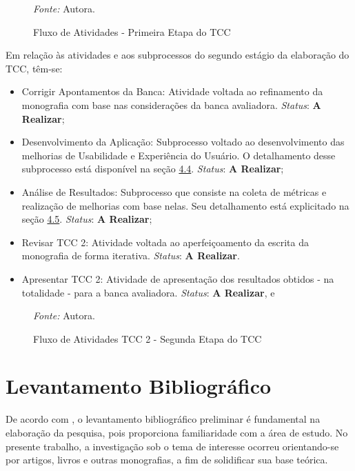 \pagebreak

\begin{figure}[h!]
	\centering
	\caption{Fluxo de Atividades - Primeira Etapa do TCC}
	\begin{tablenotes}[flushleft]
		\centering
		\item \textit{Fonte:} Autora.
	  \end{tablenotes}
	\label{fig04}
\end{figure}
Em relação às atividades e aos subprocessos do segundo estágio da elaboração do TCC, têm-se:

\begin{itemize}
	\item Corrigir Apontamentos da Banca: Atividade voltada ao refinamento da monografia com base nas considerações da banca avaliadora. \textit{Status}: \textbf{A Realizar};
	\item Desenvolvimento da Aplicação: Subprocesso voltado ao desenvolvimento das melhorias de Usabilidade e Experiência do Usuário. O detalhamento desse subprocesso está disponível na seção \hyperref[sec:Metodologia de Desenvolvimento]{4.4}. \textit{Status}: \textbf{A Realizar};
	\item Análise de Resultados: Subprocesso que consiste na coleta de métricas e realização de melhorias com base nelas. Seu detalhamento está explicitado na seção \hyperref[sec:Metodologia de Analise de Resultados]{4.5}. \textit{Status}: \textbf{A Realizar};
	\item Revisar TCC 2: Atividade voltada ao aperfeiçoamento da escrita da monografia de forma iterativa. \textit{Status}: \textbf{A Realizar}.
	\item Apresentar TCC 2: Atividade de apresentação dos resultados obtidos - na totalidade - para a banca avaliadora. \textit{Status}: \textbf{A Realizar}, e
\end{itemize}


\begin{figure}[h!]
	\centering
	\caption{Fluxo de Atividades TCC 2 - Segunda Etapa do TCC}
	\begin{tablenotes}[flushleft]
		\centering
		\item \textit{Fonte:} Autora.
	  \end{tablenotes}
	\label{fig05}
\end{figure}

\section{Levantamento Bibliográfico}
\label{sec:Levantamento Bibliografico}
De acordo com , o levantamento bibliográfico preliminar é fundamental na elaboração da pesquisa, pois proporciona familiaridade com a área de estudo. No presente trabalho, a investigação sob o tema de interesse ocorreu orientando-se por artigos, livros e outras monografias, a fim de solidificar sua base teórica.

